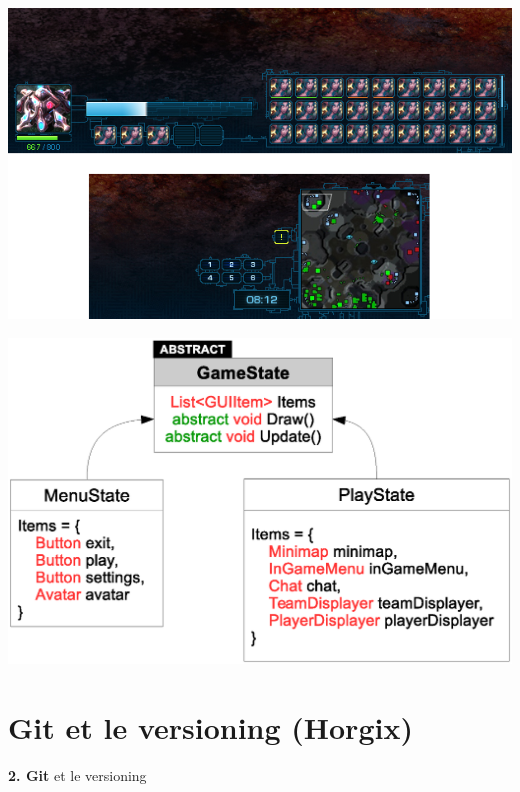 \documentclass[12pt]{beamer}
\begin{document}
\begin{frame}
    \begin{center}
        \includegraphics[scale=0.4]{img/exodus-ig-ui.png}
    \end{center}
\end{frame}

\begin{frame}
    \begin{center}
        \vspace{1cm}
        \includegraphics[scale=0.5]{img/gamestate.eps}
    \end{center}
\end{frame}

\section{Git et le versioning (Horgix)}

\begingroup
{}
\begin{frame}
    \begin{center}
        \vspace{1cm}
        {\Large\color{background} \textbf{2. Git} et le versioning}
    \end{center}
\end{frame}
\endgroup
\end{document}
